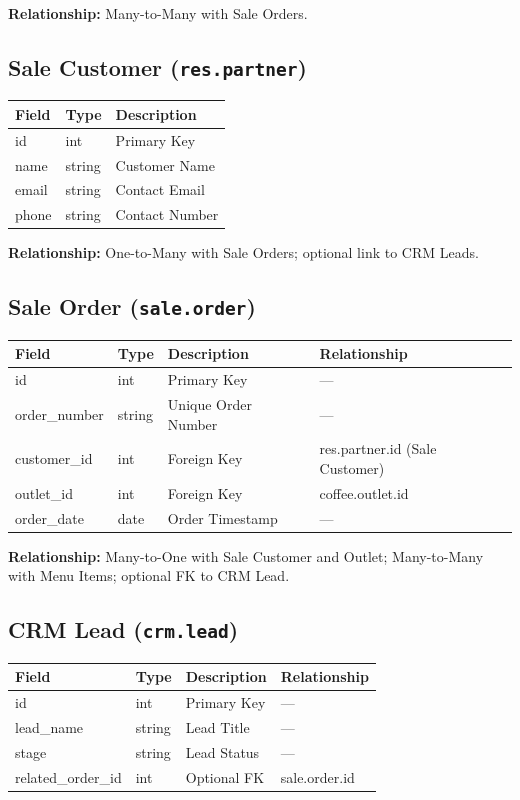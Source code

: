\noindent
\textbf{Relationship:} Many-to-Many with Sale Orders.

\subsection*{Sale Customer (\texttt{res.partner})}
\begin{tabular}{|l|l|l|}
\hline
\textbf{Field} & \textbf{Type} & \textbf{Description} \\
\hline
id & int & Primary Key \\
name & string & Customer Name \\
email & string & Contact Email \\
phone & string & Contact Number \\
\hline
\end{tabular}

\noindent
\textbf{Relationship:} One-to-Many with Sale Orders; optional link to CRM Leads.

\subsection*{Sale Order (\texttt{sale.order})}
\begin{tabular}{|l|l|l|l|}
\hline
\textbf{Field} & \textbf{Type} & \textbf{Description} & \textbf{Relationship} \\
\hline
id & int & Primary Key & — \\
order\_number & string & Unique Order Number & --- \\
customer\_id & int & Foreign Key & res.partner.id (Sale Customer) \\
outlet\_id & int & Foreign Key & coffee.outlet.id \\
order\_date & date & Order Timestamp & --- \\
\hline
\end{tabular}

\noindent
\textbf{Relationship:} Many-to-One with Sale Customer and Outlet; Many-to-Many with Menu Items; optional FK to CRM Lead.

\subsection*{CRM Lead (\texttt{crm.lead})}
\begin{tabular}{|l|l|l|l|}
\hline
\textbf{Field} & \textbf{Type} & \textbf{Description} & \textbf{Relationship} \\
\hline
id & int & Primary Key & — \\
lead\_name & string & Lead Title & --- \\
stage & string & Lead Status & — \\
related\_order\_id & int & Optional FK & sale.order.id \\
\hline
\end{tabular}

